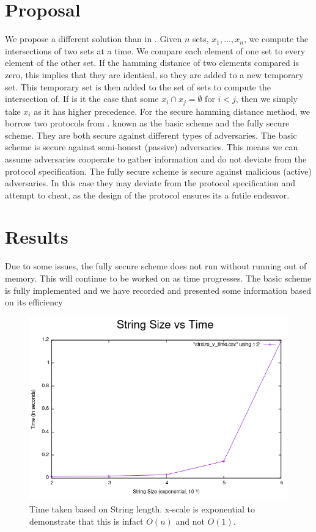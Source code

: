\documentclass[10pt]{article}
\begin{document}
\section{Proposal}
We propose a different solution than in \cite{polynomial}. Given $n$ sets, $x_1,...,x_n$, we compute the intersections of two sets at a time. We compare each element of one set to every element of the other set. If the hamming distance of two elements compared is zero, this implies that they are identical, so they are added to a new temporary set. This temporary set is then added to the set of sets to compute the intersection of. If is it the case that some $x_i \cap x_j = \emptyset$ for $i  < j$, then we simply take $x_i$ as it has higher precedence. For the secure hamming distance method, we borrow two protocols from \cite{shade}. known as the basic scheme and the fully secure scheme. They are both secure against different types of adversaries. The basic scheme is secure against semi-honest (passive) adversaries. This means we can assume adversaries cooperate to gather information and do not deviate from the protocol specification. The fully secure scheme is secure against malicious (active) adversaries. In this case they may deviate from the protocol specification and attempt to cheat, as the design of the protocol ensures its a futile endeavor. 


\section{Results}
Due to some issues, the fully secure scheme does not run without running out of memory. This will continue to be worked on as time progresses. The basic scheme is fully implemented and we have recorded and presented some information based on its efficiency

\begin{figure}[ht!]
\centering
\includegraphics[scale=0.64]{h1} 
\caption{Time taken based on String length. x-scale is exponential to demonstrate that this is infact $O(n)$ and not $O(1)$.}
\end{figure}
\end{document}
